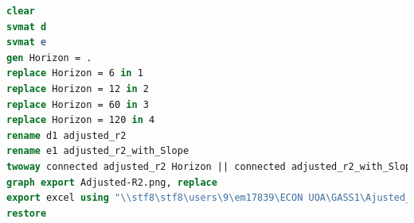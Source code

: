 \documentclass[10pt]{article}
\begin{document}
\begin{lstlisting}[language=STATA]
clear 
svmat d
svmat e
gen Horizon = .
replace Horizon = 6 in 1
replace Horizon = 12 in 2
replace Horizon = 60 in 3
replace Horizon = 120 in 4
rename d1 adjusted_r2
rename e1 adjusted_r2_with_Slope
twoway connected adjusted_r2 Horizon || connected adjusted_r2_with_Slope Horizon, ti("Figure 3: Explanatory power of UIP regression augmented""with relative yield curve slope at different horizons")
graph export Adjusted-R2.png, replace
export excel using "\\stf8\stf8\users\9\em17839\ECON UOA\GASS1\Ajusted_r2.xls", replace
restore


\end{lstlisting}
\end{document}
